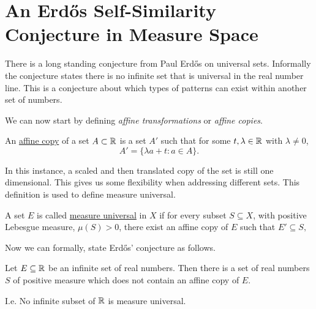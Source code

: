 \section{An Erd\H{o}s Self\hyphen{Similarity} Conjecture in Measure Space}
There is a long standing conjecture from Paul Erd\H{o}s on universal sets.  Informally the conjecture states there is no infinite set that is universal in the real number line.  This is a conjecture about which types of  patterns can exist within another set of numbers.  


We can now start by defining \textit{affine transformations} or \textit{affine copies}.
\begin{definition}
    An \underline{affine copy} of a set $A \subset \mathbb{R}$ is a set $A'$ such that for some $ t, \lambda \in \mathbb{R}$ with $\lambda \neq 0$,  $$A' = \{\lambda a + t : a \in A\}.$$
\end{definition}

In this instance, a scaled and then translated copy of the set is still one dimensional.  This gives us some flexibility when addressing different sets.  This definition is used to define measure universal. 

\begin{definition}
    A set $E$ is called \underline{measure universal} in $X$ if for every subset $S \subseteq X$, with positive Lebesgue measure, $\mu (S) > 0$, there exist an affine copy of $E$ such that $E' \subseteq S,$
\end{definition}

Now we can formally, state Erd\H{o}s' conjecture as follows. 

\begin{conjecture}\label{ErdConj}
    Let $E\subseteq \mathbb{R}$ be an infinite set of real numbers.  Then there is a set of real numbers $S$ of positive measure which does not contain an affine copy of $E$.  
    
    I.e.  No infinite subset of $\mathbb{R}$ is measure universal.  
\end{conjecture}

